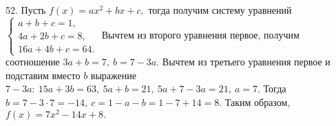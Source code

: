 52. Пусть $f(x)=ax^2+bx+c,$ тогда получим систему уравнений $\begin{cases}a+b+c=1,\\ 4a+2b+c=8,\\ 16a+4b+c=64.\end{cases}$ Вычтем из второго уравнения первое, получим соотношение $3a+b=7,\ b=7-3a.$ Вычтем из третьего уравнения первое и подставим вместо $b$ выражение $7-3a:\ 15a+3b=63,\ 5a+b=21,\ 5a+7-3a=21,\ a=7.$ Тогда $b=7-3\cdot7=-14,\ c=1-a-b=1-7+14=8.$ Таким образом, $f(x)=7x^2-14x+8.$\\
